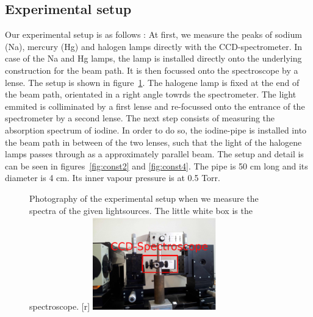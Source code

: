 \subsection{Experimental setup}
Our experimental setup is as follows \cite{versuchsanleitung}:
At first, we measure the peaks of sodium (Na), 
mercury (Hg) and halogen lamps directly with the CCD-spectrometer. 
In case of the Na and Hg lamps, the lamp is installed directly onto 
the underlying construction for the beam path. 
It is then focussed onto the spectroscope by a lense. 
The setup is shown in figure~\ref{fig:const1}. 
The halogene lamp is fixed at the end of the beam path, orientated 
in a right angle towrds the spectrometer. The light emmited is 
colliminated by a first lense and re-focussed onto the entrance of 
the spectrometer by a second lense. 
The next step consists of measuring the absorption spectrum 
of iodine. In order to do so, the iodine-pipe is installed 
into the beam path in between of the two lenses, such that 
the light of the halogene lamps passes through as a approximately 
parallel beam. The setup and detail is can be seen in 
figures~\ref{fig:const2} and \ref{fig:const4}.
The pipe is 50 cm long and its diameter is 4 cm. Its inner 
vapour pressure is at 0.5 Torr.

\begin{figure}[!t]
    \begin{captionbeside}[]{
        Photography of the experimental setup when 
        we measure the spectra of the given lightsources. 
        The little white box is the spectroscope.
        }[r]
        \includegraphics[width=0.48\textwidth]{pics/const1}
    \end{captionbeside}
    \label{fig:const1}
\end{figure}

